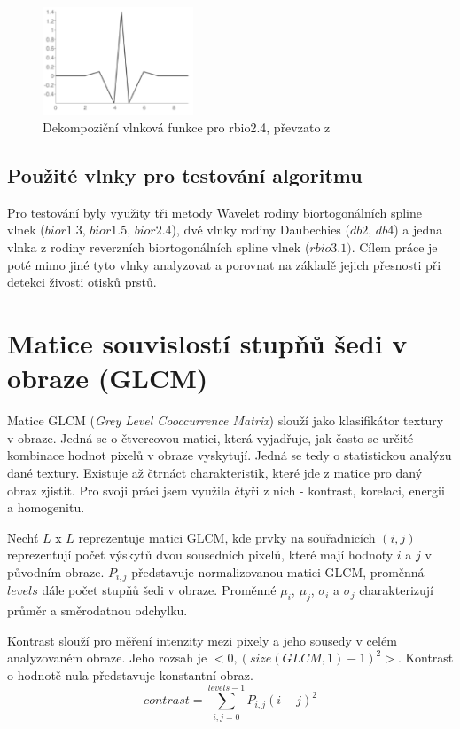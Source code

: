 \begin{figure}[!htbp]
    \centering
    \includegraphics[width=170px]{obrazky-figures/rbio31wavelet.PNG}
    \caption{Dekompoziční vlnková funkce pro rbio2.4, převzato z \cite{PyWaveletsBrowser}}
\end{figure}

\subsection{Použité vlnky pro testování algoritmu}
Pro testování byly využity tři metody Wavelet rodiny biortogonálních spline vlnek ($bior1.3$, $bior1.5$, $bior2.4$), dvě vlnky rodiny Daubechies ($db2$, $db4$) a jedna vlnka z rodiny reverzních biortogonálních spline vlnek ($rbio3.1)$. Cílem práce je poté mimo jiné tyto vlnky analyzovat a porovnat na základě jejich přesnosti při detekci živosti otisků prstů.


\section{Matice souvislostí stupňů šedi v obraze (GLCM)}
Matice GLCM (\textit{Grey Level Cooccurrence Matrix}) slouží jako klasifikátor textury v obraze. Jedná se o čtvercovou matici, která vyjadřuje, jak často se určité kombinace hodnot pixelů v obraze vyskytují. Jedná se tedy o statistickou analýzu dané textury. Existuje až čtrnáct charakteristik, které jde z matice pro daný obraz zjistit. Pro svoji práci jsem využila čtyři z nich - kontrast, korelaci, energii a homogenitu.

Nechť $L$ x $L$ reprezentuje matici GLCM, kde prvky na souřadnicích $(i,j)$ reprezentují počet výskytů dvou sousedních pixelů, které mají hodnoty $i$ a $j$ v původním obraze. $P_{i,j}$ představuje normalizovanou matici GLCM, proměnná $levels$ dále počet stupňů šedi v obraze. Proměnné $\mu_i$, $\mu_j$, $\sigma_i$ a $\sigma_j$ charakterizují průměr a směrodatnou odchylku. \cite{TouchlessANN}

Kontrast slouží pro měření intenzity mezi pixely a jeho sousedy v celém analyzovaném obraze. Jeho rozsah je $<0, (size(GLCM,1)-1)^2>$. Kontrast o hodnotě nula představuje konstantní obraz. \cite{MatlabGLCM} \cite{ScikitGLCM}
$$contrast = \sum_{i,j=0}^{levels-1}P_{i,j}(i-j)^2$$

